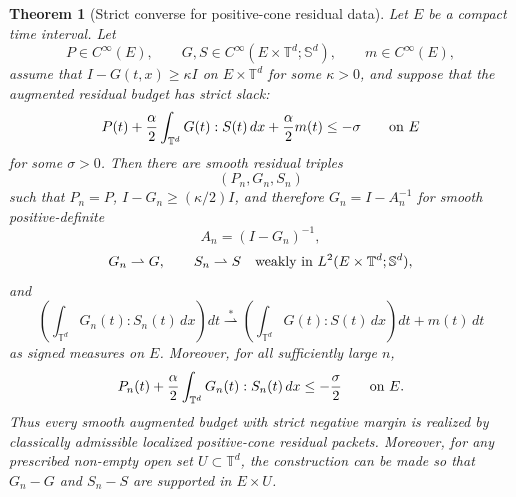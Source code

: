 \documentclass[11pt]{article}
\numberwithin{equation}{section}
\newtheorem{theorem}{Theorem}[section]
\newcommand{\T}{\mathbb T}
\newcommand{\Sym}{\mathbb S}
\begin{document}
\begin{theorem}[Strict converse for positive-cone residual data]
\label{thm:strict-augmented-converse}
Let \(E\) be a compact time interval.  Let
\[
  P\in C^\infty(E),\qquad
  G,S\in C^\infty(E\times\T^d;\Sym^d),
  \qquad
  m\in C^\infty(E),
\]
assume that \(I-G(t,x)\ge\kappa I\) on \(E\times\T^d\) for some
\(\kappa>0\), and suppose that the augmented residual budget has strict slack:
\begin{equation}
  P(t)+\frac{\alpha}{2}\int_{\T^d}G(t):S(t)\,dx
  +\frac{\alpha}{2}m(t)\le-\sigma
  \qquad\hbox{on }E
  \label{eq:strict-augmented-slack}
\end{equation}
for some \(\sigma>0\).  Then there are smooth residual triples
\[
  (P_n,G_n,S_n)
\]
such that \(P_n=P\), \(I-G_n\ge(\kappa/2)I\), and therefore
\(G_n=I-A_n^{-1}\) for smooth positive-definite
\[
  A_n=(I-G_n)^{-1},
\]
\[
  G_n\rightharpoonup G,\qquad S_n\rightharpoonup S
  \quad\hbox{weakly in }L^2(E\times\T^d;\Sym^d),
\]
and
\begin{equation}
  \left(\int_{\T^d}G_n(t):S_n(t)\,dx\right)dt
  \stackrel{*}{\rightharpoonup}
  \left(\int_{\T^d}G(t):S(t)\,dx\right)dt+m(t)\,dt
  \label{eq:strict-converse-product}
\end{equation}
as signed measures on \(E\).  Moreover, for all sufficiently large \(n\),
\begin{equation}
  P_n(t)+\frac{\alpha}{2}\int_{\T^d}G_n(t):S_n(t)\,dx
  \le -\frac{\sigma}{2}
  \qquad\hbox{on }E .
  \label{eq:strict-converse-admissible}
\end{equation}
Thus every smooth augmented budget with strict negative margin is realized by
classically admissible localized positive-cone residual packets.  Moreover, for
any prescribed non-empty open set \(U\subset\T^d\), the construction can be made
so that \(G_n-G\) and \(S_n-S\) are supported in \(E\times U\).
\end{theorem}
\end{document}
